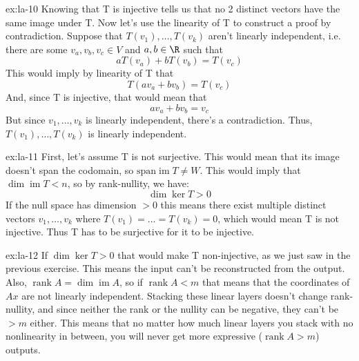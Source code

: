 \begin{solution}{ex:la-10}
  Knowing that T is injective tells us that no 2 distinct vectors have the same image under T. Now let's use the linearity of T to construct a proof by contradiction. Suppose that $T(v_1),\ldots, T(v_k)$ aren't linearly independent, i.e. there are some $v_a, v_b,v_c \in V$ and $a,b \in \R$ such that \[
    aT(v_a)+bT(v_b)=T(v_c)
  \]
  This would imply by linearity of T that
  \[
    T(av_a+bv_b)=T(v_c)
  \]
  And, since T is injective, that would mean that
  \[
    av_a+bv_b=v_c
  \]
  But since $v_1,\ldots, v_k$ is linearly independent, there's a contradiction. Thus, $T(v_1),\ldots,T(v_k)$ is linearly independent.
\end{solution}
\begin{solution}{ex:la-11}
  First, let's assume T is not surjective. This would mean that its image doesn't span the codomain, so $\text{span}\operatorname{im}T \neq W$. This would imply that $\dim \operatorname{im} T < n$, so by rank-nullity, we have:
  \[
    \dim \ker T > 0
  \]
  If the null space has dimension $> 0$ this means there exist multiple distinct vectors $v_1,\ldots,v_k$ where $T(v_1)=\ldots=T(v_k)=0$, which would mean T is not injective. Thus T has to be surjective for it to be injective.
\end{solution}
\begin{solution}{ex:la-12}
  If $\dim \ker T > 0$ that would make T non-injective, as we just saw in the previous exercise. This means the input can't be reconstructed from the output. Also, $ \operatorname{rank} A = \dim\operatorname{im} A$, so if $\operatorname{rank} A < m$ that means that the coordinates of $Ax$ are not linearly independent. Stacking these linear layers doesn't change rank-nullity, and since neither the rank or the nullity can be negative, they can't be $>m$ either. This means that no matter how much linear layers you stack with no nonlinearity in between, you will never get more expressive ($\operatorname{rank} A> m$) outputs.
\end{solution}
